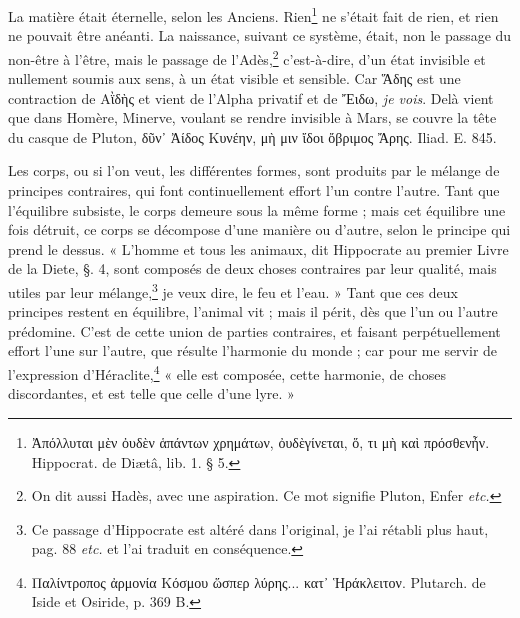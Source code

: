 \documentclass[a4paper, 18pt, oneside]{article}
\begin{document}
La matière était éternelle, selon les Anciens. Rien\footnote{Ἀπόλλυται μὲν ὀυδὲν ἁπάντων χρημάτων, ὀυδὲγίνεται, ὅ, τι μὴ καὶ πρόσθενἦν. Hippocrat. de Diætâ, lib. 1. § 5.} ne s'était fait de rien, et rien ne pouvait être anéanti. La naissance, suivant ce système, était, non le passage du non-être à l'être, mais le passage de l'Adès,\footnote{On dit aussi Hadès, avec une aspiration. Ce mot signifie Pluton, Enfer \emph{etc.}} c'est-à-dire, d'un état invisible et nullement soumis aux sens, à un état visible et sensible. Car Ἅδης est une contraction de Αῒδὴς et vient de l'Alpha privatif et de Ἔιδω, \emph{je vois}. Delà vient que dans Homère, Minerve, voulant se rendre invisible à Mars, se couvre la tête du casque de Pluton, δῦν᾽ Ἀίδος Κυνέην, μὴ μιν ἴδοι ὄβριμος Ἄρης. Iliad. E. 845.

Les corps, ou si l'on veut, les différentes formes, sont produits par le mélange de principes contraires, qui font continuellement effort l'un contre l'autre. Tant que l'équilibre subsiste, le corps demeure sous la même forme ; mais cet équilibre une fois détruit, ce corps se décompose d'une manière ou d'autre, selon le principe qui prend le dessus. « L'homme et tous les animaux, dit Hippocrate au premier Livre de la Diete, §. 4, sont composés de deux choses contraires par leur qualité, mais utiles par leur mélange,\footnote{Ce passage d'Hippocrate est altéré dans l'original, je l'ai rétabli plus haut, pag. 88 \emph{etc.} et l'ai traduit en conséquence.} je veux dire, le feu et l'eau. » Tant que ces deux principes restent en équilibre, l'animal vit ; mais il périt, dès que l'un ou l'autre prédomine. C'est de cette union de parties contraires, et faisant perpétuellement effort l'une sur l'autre, que résulte l'harmonie du monde ; car pour me servir de l'expression d'Héraclite,\footnote{Παλίντροπος ἀρμονία Κόσμου ὥσπερ λύρης... κατ᾽ Ἡράκλειτον. Plutarch. de Iside et Osiride, p. 369 B.} « elle est composée, cette harmonie, de choses discordantes, et est telle que celle d'une lyre. »
\end{document}
